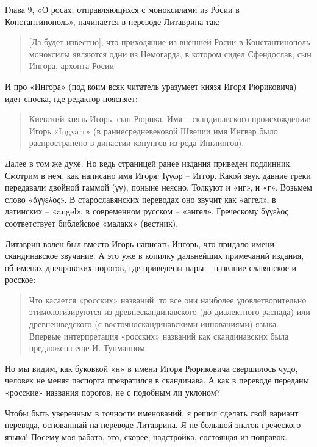 Глава 9, «О росах, отправляющихся с моноксилами из Р\'осии в Константинополь», начинается в переводе Литаврина так:

\begin{quotation}
[Да будет известно], что приходящие из внешней Росии в Константинополь моноксилы являются одни из Немогарда, в котором сидел Сфендослав, сын Ингора, архонта Росии
\end{quotation}

И про «Ингора» (под коим всяк читатель уразумеет князя Игоря Рюриковича) идет сноска, где редактор поясняет: 

\begin{quotation}
Киевский князь Игорь, сын Рюрика. Имя – скандинавского происхождения: Игорь «Ingvarr» (в раннесредневековой Швеции имя Ингвар было распространено в династии конунгов из рода Инглингов).
\end{quotation}

Далее в том же духе. Но ведь страницей ранее издания приведен подлинник. Смотрим в нем, как написано имя Игоря: Ιγγωρ – Иггор. Какой звук давние греки передавали двойной гаммой (γγ), поныне неясно. Толкуют и «нг», и «г». Возьмем слово «ἄγγελος». В старославянских переводах оно звучит как «аггел», в латинских – «angel», в современном русском – «ангел». Греческому ἄγγελος соответствует библейское «малакх» (вестник). 

Литаврин волен был вместо Игорь написать Ингорь, что придало имени скандинавское звучание. А это уже в копилку дальнейших примечаний издания, об именах днепровских порогов, где приведены пары – название славянское и росское:

\begin{quotation}
Что касается «росских» названий, то все они наиболее удовлетворительно этимологизируются из древнескандинавского (до диалектного распада) или древнешведского (с восточноскандинавскими инновациями) языка. Впервые интерпретация «росских» названий как скандинавских была предложена еще И. Тунманном.
\end{quotation}

Но мы видим, как буковкой «н» в имени Игоря Рюриковича свершилось чудо, человек не меняя паспорта превратился в скандинава. А как в переводе переданы «росские» названия порогов, не с подобным ли уклоном?

Чтобы быть уверенным в точности именований, я решил сделать свой вариант перевода, основанный на переводе Литаврина. Я не большой знаток греческого языка! Посему моя работа, это, скорее, надстройка, состоящая из поправок.

